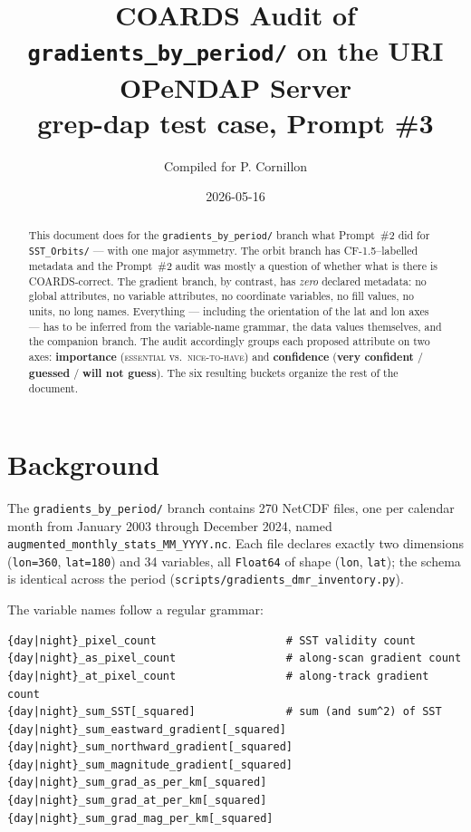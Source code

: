 \documentclass[11pt]{article}
\title{COARDS Audit of \texttt{gradients\_by\_period/} on the URI OPeNDAP Server\\
       \large grep-dap test case, Prompt \#3}
\author{Compiled for P. Cornillon}
\date{2026-05-16}
\newcommand{\vc}{\textbf{very confident}}
\newcommand{\gs}{\textbf{guessed}}
\newcommand{\nc}{\textbf{will not guess}}
\newcommand{\es}{\textsc{essential}}
\newcommand{\nh}{\textsc{nice-to-have}}
\begin{document}
\maketitle

\begin{abstract}
This document does for the \texttt{gradients\_by\_period/} branch
what Prompt~\#2 did for \texttt{SST\_Orbits/} --- with one major
asymmetry. The orbit branch has CF-1.5--labelled metadata and the
Prompt~\#2 audit was mostly a question of whether what is there is
COARDS-correct. The gradient branch, by contrast, has
\emph{zero} declared metadata: no global attributes, no variable
attributes, no coordinate variables, no fill values, no units, no
long names. Everything --- including the orientation of the lat
and lon axes --- has to be inferred from the variable-name
grammar, the data values themselves, and the companion branch.
The audit accordingly groups each proposed attribute on two axes:
\textbf{importance} (\es{} vs.\ \nh{}) and \textbf{confidence}
(\vc{} / \gs{} / \nc{}). The six resulting buckets organize the
rest of the document.
\end{abstract}

\tableofcontents

\section{Background}

The \texttt{gradients\_by\_period/} branch contains 270 NetCDF
files, one per calendar month from January 2003 through December
2024, named \texttt{augmented\_monthly\_stats\_MM\_YYYY.nc}. Each
file declares exactly two dimensions
(\texttt{lon=360}, \texttt{lat=180}) and 34 variables, all
\texttt{Float64} of shape (\texttt{lon}, \texttt{lat}); the schema
is identical across the period
(\texttt{scripts/gradients\_dmr\_inventory.py}).

The variable names follow a regular grammar:

\begin{lstlisting}
{day|night}_pixel_count                    # SST validity count
{day|night}_as_pixel_count                 # along-scan gradient count
{day|night}_at_pixel_count                 # along-track gradient count
{day|night}_sum_SST[_squared]              # sum (and sum^2) of SST
{day|night}_sum_eastward_gradient[_squared]
{day|night}_sum_northward_gradient[_squared]
{day|night}_sum_magnitude_gradient[_squared]
{day|night}_sum_grad_as_per_km[_squared]
{day|night}_sum_grad_at_per_km[_squared]
{day|night}_sum_grad_mag_per_km[_squared]
\end{lstlisting}
\end{document}
